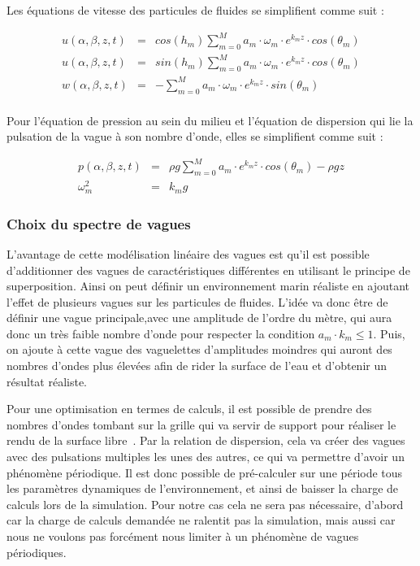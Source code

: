 				Les équations de vitesse des particules de fluides se simplifient comme suit :

				\begin{eqnarray}
					u(\alpha, \beta, z, t) & = & cos(h_m) \sum_{m=0}^M a_m \cdot \omega_m \cdot e^{k_mz} \cdot cos(\theta_m) \\
					u(\alpha, \beta, z, t) & = & sin(h_m) \sum_{m=0}^M a_m \cdot \omega_m \cdot e^{k_mz} \cdot cos(\theta_m) \\
					w(\alpha, \beta, z, t) & = & - \sum_{m=0}^M a_m \cdot \omega_m \cdot e^{k_mz} \cdot sin(\theta_m) \\
				\end{eqnarray}

				Pour l'équation de pression au sein du milieu et l'équation de dispersion qui lie la pulsation de la vague à son nombre d'onde, elles se simplifient comme suit :

				\begin{eqnarray}
					p(\alpha, \beta, z, t) & = & \rho g \sum_{m=0}^M a_m \cdot e^{k_mz} \cdot cos(\theta_m) - \rho g z\\
					\omega_m^2 & = & k_m g \label{equation:deep_dispersion}
				\end{eqnarray}

			\subsubsection{Choix du spectre de vagues}

				L'avantage de cette modélisation linéaire des vagues est qu'il est possible d'additionner des vagues de caractéristiques différentes en utilisant le principe de superposition. Ainsi on peut définir un environnement marin réaliste en ajoutant l'effet de plusieurs vagues sur les particules de fluides. L'idée va donc être de définir une vague principale,avec une amplitude de l'ordre du mètre, qui aura donc un très faible nombre d'onde pour respecter la condition $a_m \cdot k_m \le 1$. Puis, on ajoute à cette vague des vaguelettes d'amplitudes moindres qui auront des nombres d'ondes plus élevées afin de rider la surface de l'eau et d'obtenir un résultat réaliste.

				Pour une optimisation en termes de calculs, il est possible de prendre des nombres d'ondes tombant sur la grille qui va servir de support pour réaliser le rendu de la surface libre~\cite{tessendorf2001simulating}. Par la relation de dispersion, cela va créer des vagues avec des pulsations multiples les unes des autres, ce qui va permettre d'avoir un phénomène périodique. Il est donc possible de pré-calculer sur une période tous les paramètres dynamiques de l'environnement, et ainsi de baisser la charge de calculs lors de la simulation. Pour notre cas cela ne sera pas nécessaire, d'abord car la charge de calculs demandée ne ralentit pas la simulation, mais aussi car nous ne voulons pas forcément nous limiter à un phénomène de vagues périodiques.
			
